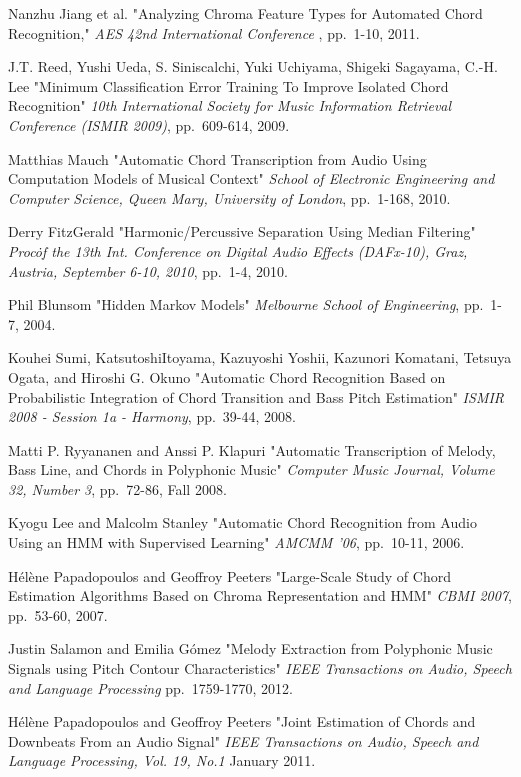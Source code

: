 \documentclass{article}
\begin{document}
\begin{thebibliography}{citations}
Nanzhu Jiang et al.
"Analyzing Chroma Feature Types for Automated Chord Recognition,"
{\it AES 42nd International Conference },
pp.~1-10, 2011.

J.T. Reed, Yushi Ueda, S. Siniscalchi, Yuki Uchiyama, Shigeki Sagayama, C.-H. Lee
"Minimum Classification Error Training To Improve Isolated Chord Recognition"
{\it 10th International Society for Music Information Retrieval Conference (ISMIR 2009)},
pp.~609-614, 2009.

Matthias Mauch
"Automatic Chord Transcription from Audio Using Computation Models of Musical Context"
{\it School of Electronic Engineering and Computer Science, Queen Mary, University of London},
pp.~1-168, 2010.

Derry FitzGerald
"Harmonic/Percussive Separation Using Median Filtering"
{\it Proc\. of the 13th Int. Conference on Digital Audio Effects (DAFx-10), Graz, Austria, September 6-10, 2010},
pp.~1-4, 2010.

Phil Blunsom
"Hidden Markov Models"
{\it Melbourne School of Engineering},
pp.~1-7, 2004.

Kouhei Sumi, KatsutoshiItoyama, Kazuyoshi Yoshii, Kazunori Komatani, Tetsuya Ogata, and Hiroshi G. Okuno
"Automatic Chord Recognition Based on Probabilistic Integration of Chord Transition and Bass Pitch Estimation"
{\it ISMIR 2008 - Session 1a - Harmony},
pp.~39-44, 2008.

Matti P. Ryyananen and Anssi P. Klapuri
"Automatic Transcription of Melody, Bass Line, and Chords in Polyphonic Music"
{\it Computer Music Journal, Volume 32, Number 3},
pp.~72-86, Fall 2008.

Kyogu Lee and Malcolm Stanley
"Automatic Chord Recognition from Audio Using an HMM with Supervised Learning"
{\it AMCMM '06},
pp.~10-11, 2006.

Hélène Papadopoulos and Geoffroy Peeters
"Large-Scale Study of Chord Estimation Algorithms Based on Chroma Representation and HMM"
{\it CBMI 2007},
pp.~53-60, 2007.

Justin Salamon and Emilia G{\'o}mez
"Melody Extraction from Polyphonic Music Signals using Pitch Contour Characteristics"
{\it IEEE Transactions on Audio, Speech and Language Processing}
pp.~1759-1770, 2012.

Hélène Papadopoulos and Geoffroy Peeters
"Joint Estimation of Chords and Downbeats From an Audio Signal"
{\it IEEE Transactions on Audio, Speech and Language Processing, Vol. 19, No.1}
January 2011.


\end{thebibliography}
\end{document}
